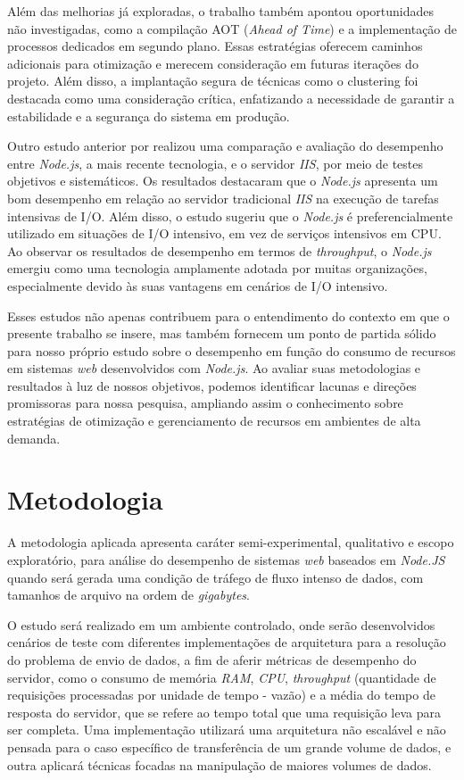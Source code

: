 \documentclass[12pt]{article}
\begin{document}
Além das melhorias já exploradas, o trabalho também apontou oportunidades não 
investigadas, como a compilação AOT (\textit{Ahead of Time}) e a implementação de processos dedicados em segundo 
plano. Essas estratégias oferecem caminhos adicionais para otimização e merecem consideração em futuras 
iterações do projeto. Além disso, a implantação segura de técnicas como o clustering foi destacada como uma 
consideração crítica, enfatizando a necessidade de garantir a estabilidade e a segurança do sistema em produção.

Outro estudo anterior por \cite{NODEJVERSUSIIS} realizou uma comparação e avaliação do desempenho entre \textit{Node.js}, a mais recente 
tecnologia, e o servidor \textit{IIS}, por meio de testes objetivos e sistemáticos. Os resultados 
destacaram que o \textit{Node.js} apresenta um bom desempenho em relação ao servidor tradicional \textit{IIS} na 
execução de tarefas intensivas de I/O. Além disso, o estudo sugeriu que o \textit{Node.js} é preferencialmente utilizado 
em situações de I/O intensivo, em vez de serviços intensivos em CPU. Ao observar os resultados de desempenho em 
termos de \textit{throughput}, o \textit{Node.js} emergiu como uma tecnologia amplamente adotada por muitas organizações, 
especialmente devido às suas vantagens em cenários de I/O intensivo.

Esses estudos não apenas contribuem para o entendimento do contexto em que o presente trabalho se insere, 
mas também fornecem um ponto de partida sólido para nosso próprio estudo sobre o desempenho em função 
do consumo de recursos em sistemas \textit{web} desenvolvidos com \textit{Node.js}. Ao avaliar suas metodologias e 
resultados à luz de nossos objetivos, podemos identificar lacunas e direções promissoras para nossa 
pesquisa, ampliando assim o conhecimento sobre estratégias de otimização e gerenciamento de recursos 
em ambientes de alta demanda.


\section{Metodologia}

A metodologia aplicada apresenta caráter semi-experimental, qualitativo
e escopo exploratório, para análise do desempenho de sistemas \textit{web} baseados em \textit{Node.JS} 
quando será gerada uma condição de tráfego de fluxo intenso de dados,
com tamanhos de arquivo na ordem de \textit{gigabytes}.

O estudo será realizado em um ambiente controlado, onde serão desenvolvidos cenários de teste com diferentes 
implementações de arquitetura para a resolução do problema de envio de dados, a fim de aferir métricas de desempenho do servidor, 
como o consumo de memória \textit{RAM}, \textit{CPU}, \textit{throughput} (quantidade de requisições processadas por unidade 
de tempo - vazão) e a média do tempo de resposta do servidor, que se refere ao tempo total que uma requisição leva
para ser completa. Uma implementação utilizará uma arquitetura não escalável e não 
pensada para o caso específico de transferência de um grande volume de dados, e outra aplicará técnicas focadas na 
manipulação de maiores volumes de dados.
\end{document}
